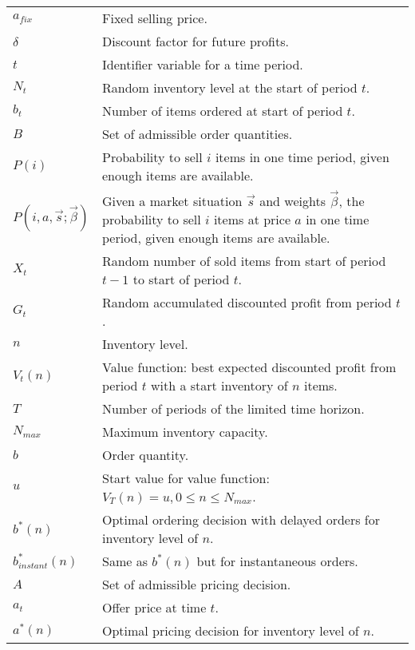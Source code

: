 \begin{longtable}{ll}
		\midrule
		$a_{fix}$ & Fixed selling price. \\
		$\delta$ & Discount factor for future profits. \\
		$t$ & Identifier variable for a time period. \\
		$N_t$ & Random inventory level at the start of period $t$. \\
		$b_t$ & Number of items ordered at start of period $t$. \\
		$B$ & Set of admissible order quantities. \\
		$P(i)$ & \makecell[l]{Probability to sell $i$ items in one time period,\\ given enough items are available.} \\
		$P(i, a, \vec{s}; \vec{\beta})$ & \makecell[l]{Given a market situation $\vec{s}$ and weights $\vec{\beta}$,\\ the probability to sell $i$ items at price $a$ in one time period,\\ given enough items are available.} \\
		$X_t$ & \makecell[l]{Random number of sold items from start of \\ period $t-1$ to start of period $t$.} \\
		$G_t$ & Random accumulated discounted profit from period $t$. \\
		$n$ & Inventory level. \\
		$V_t(n)$ & \makecell[l]{Value function: best expected discounted profit from \\ period $t$ with a start inventory of $n$ items.} \\
		$T$ & Number of periods of the limited time horizon. \\
		$N_{max}$ & Maximum inventory capacity. \\
		$b$ & Order quantity. \\
		$u$ & Start value for value function: $V_T(n) = u, 0 \leq n \leq N_{max}$. \\
		$b^*(n)$ & \makecell[l]{Optimal ordering decision with delayed orders \\ for inventory level of $n$.} \\
		$b^*_{instant}(n)$ & Same as $b^*(n)$ but for instantaneous orders. \\
		$A$ & Set of admissible pricing decision. \\
		$a_t$ & Offer price at time $t$. \\
		$a^*(n)$ & Optimal pricing decision for inventory level of $n$. \\
		

\end{longtable}
